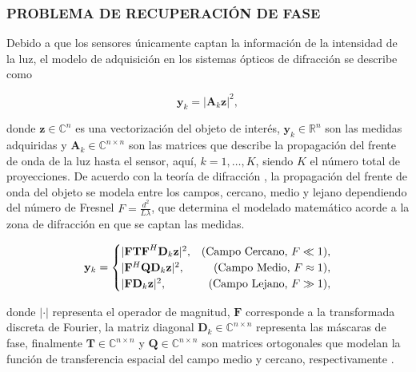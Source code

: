 \subsubsection{PROBLEMA DE RECUPERACIÓN DE FASE}

Debido a que los sensores únicamente captan la información de la intensidad de la luz, el modelo de adquisición en los sistemas ópticos de difracción se describe como

\begin{equation}
    \mathbf{y}_k = \vert \mathbf{A}_k\mathbf{z} \vert^2, 
    \label{eq:phase_retrieval_problem}
\end{equation}

donde $\mathbf{z} \in {\mathbb{C}}^{n}$ es una vectorización del objeto de interés, $\mathbf{y}_k \in \mathbb{R}^{n}$ son las medidas adquiridas y $\mathbf{A}_k\in\mathbb{C}^{n\times n}$ son las matrices que describe la propagación del frente de onda de la luz hasta el sensor, aquí,  $k=1,\dots,K$, siendo $K$ el número total de proyecciones. De acuerdo con la teoría de difracción \cite{poon2014introduction}, la propagación del frente de onda del objeto se modela entre los campos, cercano, medio y lejano dependiendo del número de Fresnel $F = \frac{d^2}{L\lambda}$, que determina el modelado matemático acorde a la zona de difracción en que se captan las medidas.

\begin{align}
    \mathbf{y}_k= 
         \begin{cases}
            \vert \mathbf{FTF}^{H}\mathbf{D}_k\mathbf{z} \vert^2, & \hfill (\text{Campo Cercano, }F \ll 1) \nonumber, \\ 
            \vert \mathbf{F}^{H}\mathbf{Q}\mathbf{D}_k\mathbf{z} \vert^2,  & \hfill (\text{Campo Medio, }F \approx 1), \\
            \vert \mathbf{F}\mathbf{D}_k\mathbf{z} \vert^2,  & \hfill (\text{Campo Lejano, } F \gg 1),   \nonumber
         \end{cases}
    \label{eq:modelado_zonas_difraccion}
\end{align}

donde $\vert \cdot \vert$ representa el operador de magnitud, $\mathbf{F}$ corresponde a la transformada discreta de Fourier, la matriz diagonal $\mathbf{D}_k \in \mathbb{C}^{n \times n}$ representa las máscaras de fase, finalmente $\mathbf{T} \in \mathbb{C}^{n \times n}$ y $\mathbf{Q} \in \mathbb{C}^{n \times n}$ son matrices ortogonales que modelan la función de transferencia espacial del campo medio y cercano, respectivamente \cite{poon2014introduction,goodman2005introduction}.

